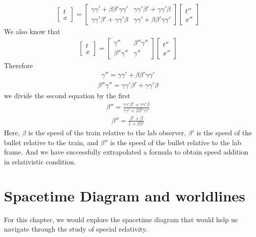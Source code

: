 \documentclass[12pt]{book}
\begin{document}
\begin{align}
\begin{bmatrix}
    t\\ x
\end{bmatrix}
=
\begin{bmatrix}
    \gamma \gamma' + \beta \beta' \gamma \gamma' & \gamma\gamma' \beta' + \gamma \gamma' \beta\\
    \gamma\gamma' \beta' + \gamma \gamma' \beta & \gamma \gamma' + \beta \beta' \gamma \gamma'
\end{bmatrix}
\begin{bmatrix}
    t''\\ x''
\end{bmatrix}
\end{align}
We also know that 
\begin{align}
\begin{bmatrix}
    t \\ x
\end{bmatrix}
=
\begin{bmatrix}
    \gamma''      &   \beta''\gamma''   \\
    \beta''\gamma'' &   \gamma''
\end{bmatrix}
\begin{bmatrix}
    t''\\ x''
\end{bmatrix}
\end{align}
Therefore
\begin{align}
\gamma'' = \gamma \gamma' + \beta \beta' \gamma \gamma'
\end{align}
\begin{align}
\beta''\gamma'' = \gamma\gamma' \beta' + \gamma \gamma' \beta
\end{align}
we divide the second equation by the first
\begin{align}
\beta '' = \frac{\gamma\gamma' \beta' + \gamma \gamma' \beta}{\gamma \gamma' + \beta \beta' \gamma \gamma'}
\end{align}
\begin{align}
\beta '' = \frac{\beta '+\beta}{1+\beta\beta'}
\end{align}
Here, $\beta$ is the speed of the train relative to the lab observer, $\beta ' $ is the speed of the bullet relative to the train, and $\beta ''$ is the speed of the bullet relative to the lab frame. And we have successfully  extrapolated a formula to obtain speed addition in relativistic condition. 

\section{Spacetime Diagram and worldlines}
For this chapter, we would explore the spacetime diagram that would help us navigate through the study of special relativity.
\end{document}
